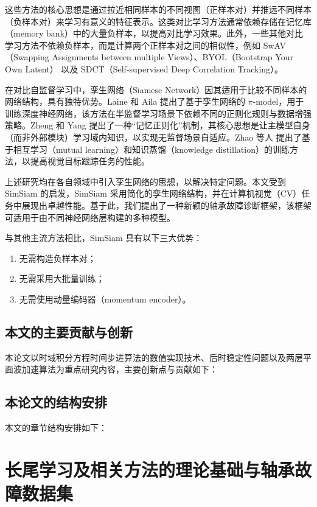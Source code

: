 \documentclass[master]{thesis-uestc}
\begin{document}
这些方法的核心思想是通过拉近相同样本的不同视图（正样本对）并推远不同样本（负样本对）来学习有意义的特征表示。这类对比学习方法通常依赖存储在记忆库（memory bank）中的大量负样本，以提高对比学习效果。此外，一些其他对比学习方法不依赖负样本，而是计算两个正样本对之间的相似性，例如 SwAV（Swapping Assignments between multiple Views）、BYOL（Bootstrap Your Own Latent） 以及 SDCT（Self-supervised Deep Correlation Tracking）。

在对比自监督学习中，孪生网络（Siamese Network）因其适用于比较不同样本的网络结构，具有独特优势。Laine 和 Aila 提出了基于孪生网络的 $\pi$-model，用于训练深度神经网络，该方法在半监督学习场景下依赖不同的正则化规则与数据增强策略。Zheng 和 Yang 提出了一种“记忆正则化”机制，其核心思想是让主模型自身（而非外部模块）学习域内知识，以实现无监督场景自适应。Zhao 等人 提出了基于相互学习（mutual learning）和知识蒸馏（knowledge distillation）的训练方法，以提高视觉目标跟踪任务的性能。

上述研究均在各自领域中引入孪生网络的思想，以解决特定问题。本文受到 SimSiam 的启发，SimSiam 采用简化的孪生网络结构，并在计算机视觉（CV）任务中展现出卓越性能。基于此，我们提出了一种新颖的轴承故障诊断框架，该框架可适用于由不同神经网络层构建的多种模型。

与其他主流方法相比，SimSiam 具有以下三大优势：
\begin{enumerate}
    \item 无需构造负样本对；
    \item 无需采用大批量训练；
    \item 无需使用动量编码器（momentum encoder）。
\end{enumerate}


\section{本文的主要贡献与创新}
本论文以时域积分方程时间步进算法的数值实现技术、后时稳定性问题以及两层平面波加速算法为重点研究内容，主要创新点与贡献如下：

\section{本论文的结构安排}
本文的章节结构安排如下：

\chapter{长尾学习及相关方法的理论基础与轴承故障数据集}
\end{document}
